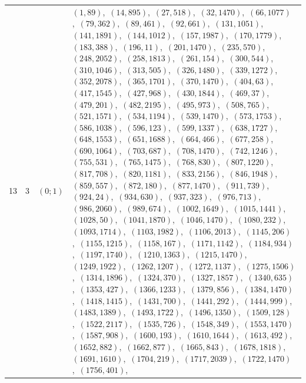 \documentclass[11pt]{article}
\begin{document}
\begin{longtable}{@{}rrl>{\raggedright\arraybackslash}p{}@{}}
13 & 3 & $(0;1)$ & $(1,89)$,\allowbreak\ $(14,895)$,\allowbreak\ $(27,518)$,\allowbreak\ $(32,1470)$,\allowbreak\ $(66,1077)$,\allowbreak\ $(79,362)$,\allowbreak\ $(89,461)$,\allowbreak\ $(92,661)$,\allowbreak\ $(131,1051)$,\allowbreak\ $(141,1891)$,\allowbreak\ $(144,1012)$,\allowbreak\ $(157,1987)$,\allowbreak\ $(170,1779)$,\allowbreak\ $(183,388)$,\allowbreak\ $(196,11)$,\allowbreak\ $(201,1470)$,\allowbreak\ $(235,570)$,\allowbreak\ $(248,2052)$,\allowbreak\ $(258,1813)$,\allowbreak\ $(261,154)$,\allowbreak\ $(300,544)$,\allowbreak\ $(310,1046)$,\allowbreak\ $(313,505)$,\allowbreak\ $(326,1480)$,\allowbreak\ $(339,1272)$,\allowbreak\ $(352,2078)$,\allowbreak\ $(365,1701)$,\allowbreak\ $(370,1470)$,\allowbreak\ $(404,63)$,\allowbreak\ $(417,1545)$,\allowbreak\ $(427,968)$,\allowbreak\ $(430,1844)$,\allowbreak\ $(469,37)$,\allowbreak\ $(479,201)$,\allowbreak\ $(482,2195)$,\allowbreak\ $(495,973)$,\allowbreak\ $(508,765)$,\allowbreak\ $(521,1571)$,\allowbreak\ $(534,1194)$,\allowbreak\ $(539,1470)$,\allowbreak\ $(573,1753)$,\allowbreak\ $(586,1038)$,\allowbreak\ $(596,123)$,\allowbreak\ $(599,1337)$,\allowbreak\ $(638,1727)$,\allowbreak\ $(648,1553)$,\allowbreak\ $(651,1688)$,\allowbreak\ $(664,466)$,\allowbreak\ $(677,258)$,\allowbreak\ $(690,1064)$,\allowbreak\ $(703,687)$,\allowbreak\ $(708,1470)$,\allowbreak\ $(742,1246)$,\allowbreak\ $(755,531)$,\allowbreak\ $(765,1475)$,\allowbreak\ $(768,830)$,\allowbreak\ $(807,1220)$,\allowbreak\ $(817,708)$,\allowbreak\ $(820,1181)$,\allowbreak\ $(833,2156)$,\allowbreak\ $(846,1948)$,\allowbreak\ $(859,557)$,\allowbreak\ $(872,180)$,\allowbreak\ $(877,1470)$,\allowbreak\ $(911,739)$,\allowbreak\ $(924,24)$,\allowbreak\ $(934,630)$,\allowbreak\ $(937,323)$,\allowbreak\ $(976,713)$,\allowbreak\ $(986,2060)$,\allowbreak\ $(989,674)$,\allowbreak\ $(1002,1649)$,\allowbreak\ $(1015,1441)$,\allowbreak\ $(1028,50)$,\allowbreak\ $(1041,1870)$,\allowbreak\ $(1046,1470)$,\allowbreak\ $(1080,232)$,\allowbreak\ $(1093,1714)$,\allowbreak\ $(1103,1982)$,\allowbreak\ $(1106,2013)$,\allowbreak\ $(1145,206)$,\allowbreak\ $(1155,1215)$,\allowbreak\ $(1158,167)$,\allowbreak\ $(1171,1142)$,\allowbreak\ $(1184,934)$,\allowbreak\ $(1197,1740)$,\allowbreak\ $(1210,1363)$,\allowbreak\ $(1215,1470)$,\allowbreak\ $(1249,1922)$,\allowbreak\ $(1262,1207)$,\allowbreak\ $(1272,1137)$,\allowbreak\ $(1275,1506)$,\allowbreak\ $(1314,1896)$,\allowbreak\ $(1324,370)$,\allowbreak\ $(1327,1857)$,\allowbreak\ $(1340,635)$,\allowbreak\ $(1353,427)$,\allowbreak\ $(1366,1233)$,\allowbreak\ $(1379,856)$,\allowbreak\ $(1384,1470)$,\allowbreak\ $(1418,1415)$,\allowbreak\ $(1431,700)$,\allowbreak\ $(1441,292)$,\allowbreak\ $(1444,999)$,\allowbreak\ $(1483,1389)$,\allowbreak\ $(1493,1722)$,\allowbreak\ $(1496,1350)$,\allowbreak\ $(1509,128)$,\allowbreak\ $(1522,2117)$,\allowbreak\ $(1535,726)$,\allowbreak\ $(1548,349)$,\allowbreak\ $(1553,1470)$,\allowbreak\ $(1587,908)$,\allowbreak\ $(1600,193)$,\allowbreak\ $(1610,1644)$,\allowbreak\ $(1613,492)$,\allowbreak\ $(1652,882)$,\allowbreak\ $(1662,877)$,\allowbreak\ $(1665,843)$,\allowbreak\ $(1678,1818)$,\allowbreak\ $(1691,1610)$,\allowbreak\ $(1704,219)$,\allowbreak\ $(1717,2039)$,\allowbreak\ $(1722,1470)$,\allowbreak\ $(1756,401)$,\allowbreak\ 
\end{longtable}
\end{document}
